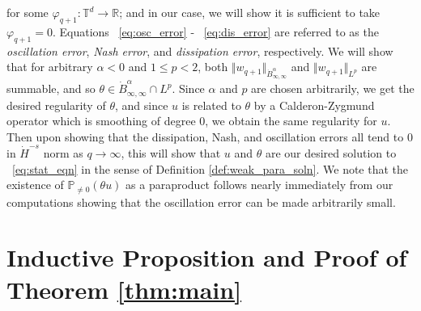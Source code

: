 \documentclass[12pt,reqno,letterpaper]{amsart}
\numberwithin{equation}{section}
\newcommand{\1}{{\bf 1}}
\newcommand{\2}{{\bf 2}}
\newcommand{\R}{\mathbb R}
\newcommand{\T}{\mathbb T}
\theoremstyle{remark}
\theoremstyle{remark}
\begin{document}
for some $\varphi_{q+1}: \T^d \to \R$; and in our case, we will show it is sufficient to take $\varphi_{q+1} = 0$. Equations ~\eqref{eq:osc_error} - ~\eqref{eq:dis_error} are referred to as the \textit{oscillation error}, \textit{Nash error}, and \textit{dissipation error}, respectively. We will show that for arbitrary $\alpha < 0$ and $1 \leq p < 2$, both $\Vert w_{q+1} \Vert_{\dot{B}^\alpha_{\infty,\infty}}$ and $\Vert w_{q+1} \Vert_{L^p}$ are summable, and so $\theta \in \dot{B}^\alpha_{\infty,\infty} \cap L^p$. Since $\alpha$ and $p$ are chosen arbitrarily, we get the desired regularity of $\theta$, and since $u$ is related to $\theta$ by a Calderon-Zygmund operator which is smoothing of degree $0$, we obtain the same regularity for $u$. Then upon showing that the dissipation, Nash, and oscillation errors all tend to $0$ in $\dot{H}^{-s}$ norm as $q \to \infty$, this will show that $u$ and $\theta$ are our desired solution to ~\eqref{eq:stat_eqn} in the sense of Definition \ref{def:weak_para_soln}. We note that the existence of $\mathbb{P}_{\not=0}(\theta u)$ as a paraproduct follows nearly immediately from our computations showing that the oscillation error can be made arbitrarily small.







\section{Inductive Proposition and Proof of Theorem \ref{thm:main}}\label{Section4}
\end{document}
